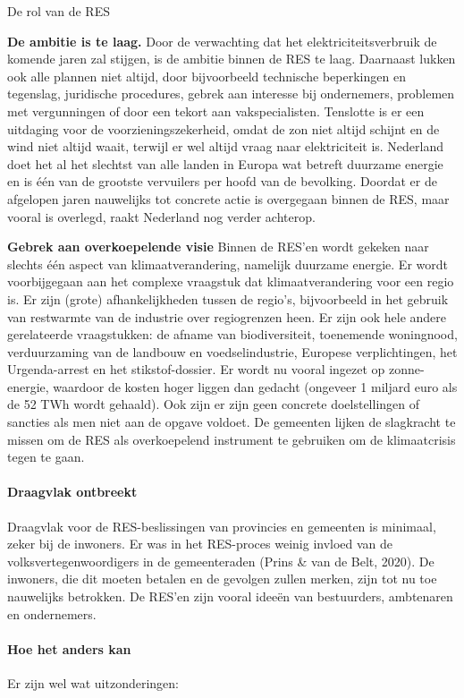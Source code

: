 \begin{voorstel}{De rol van de RES}
\begin{multicols*}{2}
\begin{overwegingen}
\textbf{De ambitie is te laag.} Door de verwachting dat het elektriciteitsverbruik de komende jaren zal stijgen, is de ambitie binnen de RES te laag. Daarnaast lukken ook alle plannen niet altijd, door bijvoorbeeld technische beperkingen en tegenslag, juridische procedures, gebrek aan interesse bij ondernemers, problemen met vergunningen of door een tekort aan vakspecialisten. Tenslotte is er een uitdaging voor de voorzieningszekerheid, omdat de zon niet altijd schijnt en de wind niet altijd waait, terwijl er wel altijd vraag naar elektriciteit is. Nederland doet het al het slechtst van alle landen in Europa wat betreft duurzame energie en is één van de grootste vervuilers per hoofd van de bevolking. Doordat er de afgelopen jaren nauwelijks tot concrete actie is overgegaan binnen de RES, maar vooral is overlegd, raakt Nederland nog verder achterop.

\textbf{Gebrek aan overkoepelende visie} Binnen de RES’en wordt gekeken naar slechts één aspect van klimaatverandering, namelijk duurzame energie. Er wordt voorbijgegaan aan het complexe vraagstuk dat klimaatverandering voor een regio is. Er zijn (grote) afhankelijkheden tussen de regio’s, bijvoorbeeld in het gebruik van restwarmte van de industrie over regiogrenzen heen. Er zijn ook hele andere gerelateerde vraagstukken: de afname van biodiversiteit, toenemende woningnood, verduurzaming van de landbouw en voedselindustrie, Europese verplichtingen, het Urgenda-arrest en het stikstof-dossier. Er wordt nu vooral ingezet op zonne-energie, waardoor de kosten hoger liggen dan gedacht (ongeveer 1 miljard euro als de 52 TWh wordt gehaald). Ook zijn er zijn geen concrete doelstellingen of sancties als men niet aan de opgave voldoet. De gemeenten lijken de slagkracht te missen om de RES als overkoepelend instrument te gebruiken om de klimaatcrisis tegen te gaan.

\paragraph{Draagvlak ontbreekt}
Draagvlak voor de RES-beslissingen van provincies en gemeenten is minimaal, zeker bij de inwoners. Er was in het RES-proces weinig invloed van de volksvertegenwoordigers in de gemeenteraden (Prins \& van de Belt, 2020). De inwoners, die dit moeten betalen en de gevolgen zullen merken, zijn tot nu toe nauwelijks betrokken. De RES’en zijn vooral ideeën van bestuurders, ambtenaren en ondernemers.

\paragraph{Hoe het anders kan}
Er zijn wel wat uitzonderingen:


\end{overwegingen}
\end{multicols*}
\end{voorstel}
